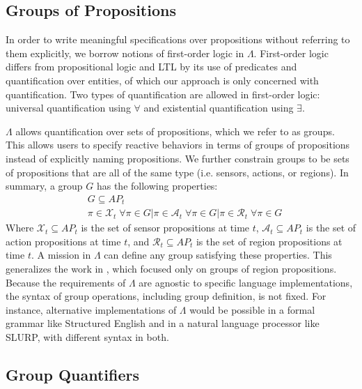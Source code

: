 \subsection{Groups of Propositions} 

In order to write meaningful specifications over propositions without referring to them explicitly, we borrow notions of first-order logic in $\Lambda$. 
First-order logic differs from propositional logic and LTL by its use of predicates and quantification over entities, of which our approach is only concerned with quantification. 
Two types of quantification are allowed in first-order logic: universal quantification using $\forall$ and existential quantification using $\exists$. 
\par $\Lambda$ allows quantification over sets of propositions, which we refer to as groups. 
This allows users to specify reactive behaviors in terms of groups of propositions instead of explicitly naming propositions. 
We further constrain groups to be sets of propositions that are all of the same type (i.e. sensors, actions, or regions). 
In summary, a group $G$ has the following properties:
\begin{subequations}
\begin{align}
	&G \subseteq AP_t \\
	&\pi \in \mathcal{X}_t \; \forall \pi \in G | \pi \in \mathcal{A}_t \; \forall \pi \in G | \pi \in \mathcal{R}_t \;\forall \pi \in G
\end{align}
\end{subequations}
Where $\mathcal{X}_t \subseteq AP_t$ is the set of sensor propositions at time $t$, $\mathcal{A}_t \subseteq AP_t$ is the set of action propositions at time $t$, and $\mathcal{R}_t \subseteq AP_t$ is the set of region propositions at time $t$. 
A mission in $\Lambda$ can define any group satisfying these properties.
This generalizes the work in \cite{BingxinRSS2012}, which focused only on groups of region propositions. 
Because the requirements of $\Lambda$ are agnostic to specific language implementations, the syntax of group operations, including group definition, is not fixed. 
For instance, alternative implementations of $\Lambda$ would be possible in a formal grammar like Structured English\cite{Finucane2010} and in a natural language processor like SLURP\cite{RamanRSS2013}, with different syntax in both. 

\subsection{Group Quantifiers}

